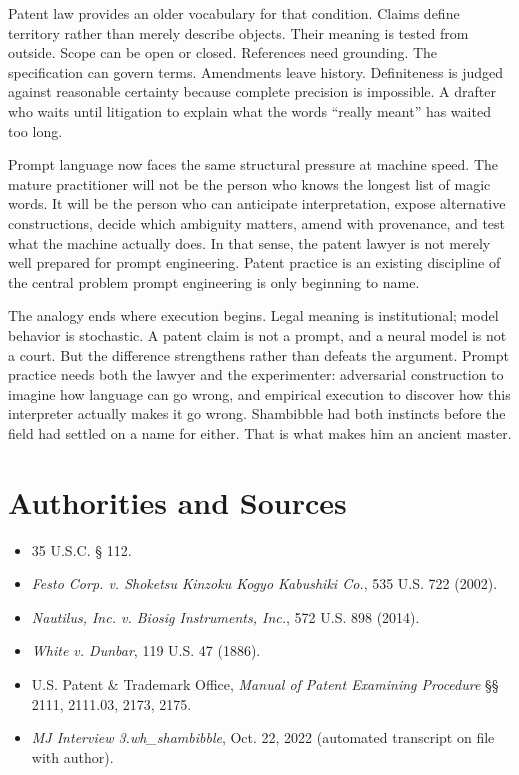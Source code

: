 \documentclass[11pt]{article}
\begin{document}
Patent law provides an older vocabulary for that condition. Claims define territory rather than merely describe objects. Their meaning is tested from outside. Scope can be open or closed. References need grounding. The specification can govern terms. Amendments leave history. Definiteness is judged against reasonable certainty because complete precision is impossible. A drafter who waits until litigation to explain what the words ``really meant'' has waited too long.

Prompt language now faces the same structural pressure at machine speed. The mature practitioner will not be the person who knows the longest list of magic words. It will be the person who can anticipate interpretation, expose alternative constructions, decide which ambiguity matters, amend with provenance, and test what the machine actually does. In that sense, the patent lawyer is not merely well prepared for prompt engineering. Patent practice is an existing discipline of the central problem prompt engineering is only beginning to name.

The analogy ends where execution begins. Legal meaning is institutional; model behavior is stochastic. A patent claim is not a prompt, and a neural model is not a court. But the difference strengthens rather than defeats the argument. Prompt practice needs both the lawyer and the experimenter: adversarial construction to imagine how language can go wrong, and empirical execution to discover how this interpreter actually makes it go wrong. Shambibble had both instincts before the field had settled on a name for either. That is what makes him an ancient master.

\section*{Authorities and Sources}
\begin{itemize}[leftmargin=1.5em]
\item 35 U.S.C. § 112.
\item \emph{Festo Corp. v. Shoketsu Kinzoku Kogyo Kabushiki Co.}, 535 U.S. 722 (2002).
\item \emph{Nautilus, Inc. v. Biosig Instruments, Inc.}, 572 U.S. 898 (2014).
\item \emph{White v. Dunbar}, 119 U.S. 47 (1886).
\item U.S. Patent \& Trademark Office, \emph{Manual of Patent Examining Procedure} §§ 2111, 2111.03, 2173, 2175.
\item \emph{MJ Interview 3.wh\_shambibble}, Oct. 22, 2022 (automated transcript on file with author).
\end{itemize}
\newpage
\end{document}
